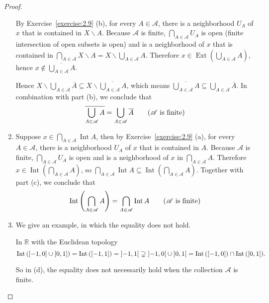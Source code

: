 \begin{proof}
\begin{enumerate}[label={(\alph*)}]
		      By Exercise~\ref{exercise:2.9} (b), for every $A\in\mathscr{A}$, there is a neighborhood $U_{A}$ of $x$ that is contained in $X\smallsetminus A$. Because $\mathscr{A}$ is finite, $\bigcap_{A\in\mathscr{A}}U_{A}$ is open (finite intersection of open subsets is open) and is a neighborhood of $x$ that is contained in $\bigcap_{A\in\mathscr{A}}X\smallsetminus A = X\smallsetminus\bigcup_{A\in\mathscr{A}}A$. Therefore $x\in \operatorname{Ext}\left({\bigcup_{A\in\mathscr{A}}A}\right)$, hence $x\notin\overline{\bigcup_{A\in\mathscr{A}}A}$.

		      Hence $X\smallsetminus \bigcup_{A\in\mathscr{A}}\overline{A} \subseteq X\smallsetminus \overline{\bigcup_{A\in\mathscr{A}}A}$, which means $\overline{\bigcup_{A\in\mathscr{A}}A}\subseteq \bigcup_{A\in\mathscr{A}}\overline{A}$. In combination with part (b), we conclude that
		      \[
			      \overline{\bigcup_{A\in\mathscr{A}}A} = \bigcup_{A\in\mathscr{A}}\overline{A} \tag{$\mathscr{A}$ is finite}
		      \]
		\item Suppose $x\in \bigcap_{A\in\mathscr{A}}\operatorname{Int}A$, then by Exercise~\ref{exercise:2.9} (a), for every $A\in\mathscr{A}$, there is a neighborhood $U_{A}$ of $x$ that is contained in $A$. Because $\mathscr{A}$ is finite, $\bigcap_{A\in\mathscr{A}}U_{A}$ is open and is a neighborhood of $x$ in $\bigcap_{A\in\mathscr{A}}A$. Therefore $x\in \operatorname{Int}\left(\bigcap_{A\in\mathscr{A}}A\right)$, so $\bigcap_{A\in\mathscr{A}}\operatorname{Int}A \subseteq \operatorname{Int}\left(\bigcap_{A\in\mathscr{A}}A\right)$. Together with part (c), we conclude that
		      \[
			      \operatorname{Int}\left(\bigcap_{A\in\mathscr{A}}A\right) = \bigcap_{A\in\mathscr{A}}\operatorname{Int}A \tag{$\mathscr{A}$ is finite}
		      \]
		\item We give an example, in which the equality does not hold.

		      In $\mathbb{R}$ with the Euclidean topology
		      \[
			      \operatorname{Int}\left({\left[{-1,0}\right] \cup \left[{0,1}\right]}\right) = \operatorname{Int}{\left(\left[{-1,1}\right]\right)} = \left]{-1,1}\right[ \supsetneq \left]{-1,0}\right[ \cup \left]{0,1}\right[ = \operatorname{Int}{\left(\left[{-1,0}\right]\right)}\cap\operatorname{Int}{\left(\left[{0,1}\right]\right)}.
		      \]

		      So in (d), the equality does not necessarily hold when the collection $\mathscr{A}$ is finite.
	\end{enumerate}
\end{proof}

